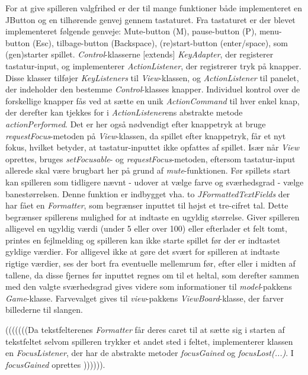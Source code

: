 \documentclass{report}
\begin{document}
For at give spilleren valgfrihed er der til mange funktioner både implementeret en JButton og en tilhørende genvej gennem tastaturet. Fra tastaturet er der blevet implementeret følgende genveje: Mute-button (M), pause-button (P), menu-button (Esc), tilbage-button (Backspace), (re)start-button (enter/space), som (gen)starter spillet. \textit{Control}-klasserne [extends] \textit{KeyAdapter}, der registerer tastatur-input, og implementerer \textit{ActionListener}, der registrerer tryk på knapper. Disse klasser tilføjer \textit{KeyListeners} til \textit{View}-klassen, og \textit{ActionListener} til panelet, der indeholder den bestemme \textit{Control}-klasses knapper. Individuel kontrol over de forskellige knapper fås ved at sætte en unik \textit{ActionCommand} til hver enkel knap, der derefter kan tjekkes for i \textit{ActionListener}ens abstrakte metode \textit{actionPerformed}. Det er her også nødvendigt efter knappetryk at bruge \textit{requestFocus}-metoden på \textit{View}-klassen, da spillet efter knappetryk, får et nyt fokus, hvilket betyder, at tastatur-inputtet ikke opfattes af spillet.
Især når \textit{View} oprettes, bruges \textit{setFocusable}- og \textit{requestFocus}-metoden, eftersom tastatur-input allerede skal være brugbart her på grund af \textit{mute}-funktionen.
Før spillets start kan spilleren som tidligere nævnt - udover at vælge farve og sværhedsgrad - vælge banestørrelsen. Denne funktion er indbygget vha. to \textit{JFormattedTextFields} der har fået en \textit{Formatter}, som begrænser inputtet til højst et tre-cifret tal. Dette begrænser spillerens mulighed for at indtaste en ugyldig størrelse. Giver spilleren alligevel en ugyldig værdi (under 5 eller over 100) eller efterlader et felt tomt, printes en fejlmelding og spilleren kan ikke starte spillet før der er indtastet gyldige værdier. For alligevel ikke at gøre det svært for spilleren at indtaste rigtige værdier, ses der bort fra eventuelle mellemrum før, efter eller i midten af tallene, da disse fjernes før inputtet regnes om til et heltal, som derefter sammen med den valgte sværhedsgrad gives videre som informationer til \textit{model}-pakkens \textit{Game}-klasse. Farvevalget gives til \textit{view}-pakkens \textit{ViewBoard}-klasse, der farver billederne til slangen.

(((((((Da tekstfelterenes \textit{Formatter} får deres caret til at sætte sig i starten af tekstfeltet selvom spilleren trykker et andet sted i feltet, implementerer klassen en \textit{FocusListener}, der har de abstrakte metoder \textit{focusGained} og \textit{focusLost(...)}. I \textit{focusGained} oprettes )))))).
\end{document}
